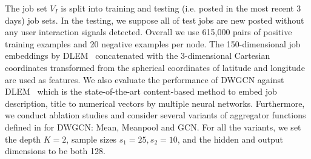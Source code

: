 \documentclass[manuscript,screen,review]{acmart}
\begin{document}
The job set $V_I$ is split into training and testing (i.e. posted in the most recent 3 days) job sets. In the testing, we suppose all of test jobs are new posted without any user interaction signals detected. Overall we use 615,000 pairs of positive training examples and 20 negative examples per node. 
%
The 150-dimensional job embeddings by DLEM~\cite{zhao:2021embedding} concatenated with the 3-dimensional Cartesian coordinates transformed from the spherical coordinates of latitude and longitude are used as features. We also evaluate the performance of DWGCN against DLEM~\cite{zhao:2021embedding}  which is the  state-of-the-art content-based method to embed job description, title to numerical vectors by multiple neural networks. Furthermore, we conduct ablation studies and consider several variants of aggregator functions defined in \cite{hamilton2017inductive} for DWGCN: Mean, Meanpool and GCN. For all the variants, we set the depth $K=2$, sample sizes $s_1=25,s_2=10$, and the hidden and output dimensions to be both 128.




\end{document}

